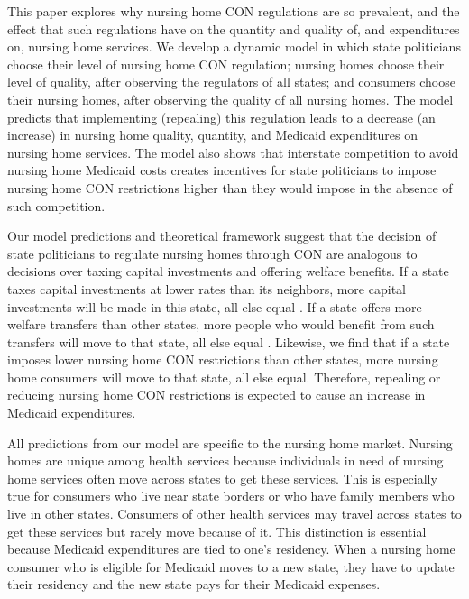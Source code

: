 \documentclass[../Main.tex]{subfiles}
\begin{document}
This paper explores why nursing home CON regulations are so prevalent, and the effect that such regulations have on the quantity and quality of, and expenditures on, nursing home services. We develop a dynamic model in which state politicians choose their level of nursing home CON regulation; nursing homes choose their level of quality, after observing the regulators of all states; and consumers choose their nursing homes, after observing the quality of all nursing homes. The model predicts that implementing (repealing) this regulation leads to a decrease (an increase) in nursing home quality, quantity, and Medicaid expenditures on nursing home services. The model also shows that interstate competition to avoid nursing home Medicaid costs creates incentives for state politicians to impose nursing home CON restrictions higher than they would impose in the absence of such competition. 

Our model predictions and theoretical framework suggest that the decision of state politicians to regulate nursing homes through CON are analogous to decisions over taxing capital investments and offering welfare benefits. If a state taxes capital investments at lower rates than its neighbors, more capital investments will be made in this state, all else equal \citep{zodrow1986pigou,bucovetsky1991asymmetric, kanbur1993jeux, basinger2004remodeling, plumper2009there}. If a state offers more welfare transfers than other states, more people who would benefit from such transfers will move to that state, all else equal \citep{gramlich1984migration, peterson1989american, saavedra2000model}. Likewise, we find that if a state imposes lower nursing home CON restrictions than other states, more nursing home consumers will move to that state, all else equal. Therefore, repealing or reducing nursing home CON restrictions is expected to cause an increase in Medicaid expenditures.

All predictions from our model are specific to the nursing home market. Nursing homes are unique among health services because individuals in need of nursing home services often move across states to get these services. This is especially true for consumers who live near state borders or who have family members who live in other states. Consumers of other health services may travel across states to get these services but rarely move because of it. This distinction is essential because Medicaid expenditures are tied to one's residency. When a nursing home consumer who is eligible for Medicaid moves to a new state, they have to update their residency and the new state pays for their Medicaid expenses.  
\end{document}
